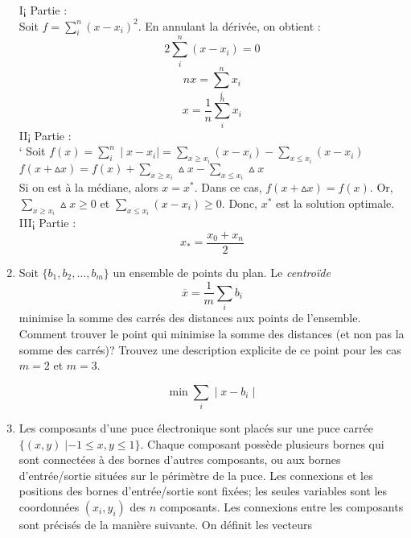 \begin{enumerate}
    \begin{solution}
      I¡ Partie : \\
      \newline
      Soit $f = \sum_{i}^{n}(x-x_{i})^{2}$. En annulant la dérivée, on obtient : 
      $$ 2\sum_{i}^{n}(x-x_{i}) = 0$$
      $$ nx = \sum_{i}^{n} x_{i}$$
      $$ x = \frac{1}{n}\sum_{i}^{n} x_{i}$$
      \newline
      II¡ Partie : \\
      \newline`
      Soit $f(x) = \sum_{i}^{n}\mid x-x_{i}\mid = \sum_{x \geq x_{i}} (x-x_{i}) - \sum_{x \le x_{i}} (x-x_{i})$\\
      \newline
      $f(x + \vartriangle x) = f(x) + \sum_{x \geq x_{i}} \vartriangle x - \sum_{x \le x_{i}} \vartriangle x$ \\
      \newline
      Si on est à la médiane, alors $x = x^{*}$. Dans ce cas, $f(x + \vartriangle x) = f(x) $. Or, $\sum_{x \geq x_{i}} \vartriangle x \geq 0$ et $  \sum_{x \le x_{i}} (x-x_{i}) \geq 0$. Donc, $x^{*}$ est la solution optimale. \\
      \newline
      III¡ Partie : \\
      \newline
      $$x_{*} = \frac{x_{0} + x_{n}}{2}$$
    \end{solution}



  \item  Soit $\{b_1, b_2, \ldots, b_m\}$ un ensemble de points du plan. Le \emph{centro\"ide}
    $$\overline x = \frac{1}{m} \sum_i b_i$$
    minimise la somme des carrés des distances aux points de l'ensemble. Comment trouver le point qui minimise la somme des distances (et
    non pas la somme des carrés)? Trouvez une description explicite de ce point pour les cas $m=2$ et $m=3$.

    \begin{solution}
      $$\min \sum_{i} \mid x - b_{i} \mid $$
    \end{solution}




  \item  Les composants d'une puce électronique sont placés sur
    une puce carrée $\{ (x, y) \; |  -1 \leq x, y \leq 1\}$.
    Chaque composant possède plusieurs bornes qui sont connectées à
    des bornes d'autres composants, ou aux bornes d'entrée/\-sortie situées sur le périmètre de la puce.  Les connexions et les
    positions des bornes d'entrée/sortie sont fixées; les seules variables sont les coordonnées   $(x_i, y_i)$ des $n$
    composants.  Les connexions entre les composants
    sont précisés de la manière suivante. On définit les vecteurs



\end{enumerate}
